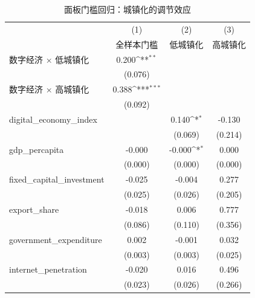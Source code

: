 \begin{table}[htbp]\centering
\def\sym#1{\ifmmode^{#1}\else\(^{#1}\)\fi}
\caption{面板门槛回归：城镇化的调节效应\label{tab:threshold}}
\begin{tabular}{l*{3}{c}}
\toprule
                    &\multicolumn{1}{c}{(1)}&\multicolumn{1}{c}{(2)}&\multicolumn{1}{c}{(3)}\\
                    &\multicolumn{1}{c}{全样本门槛}&\multicolumn{1}{c}{低城镇化}&\multicolumn{1}{c}{高城镇化}\\
\midrule
数字经济 × 低城镇化 &       0.200\sym{**} &                     &                     \\
                    &     (0.076)         &                     &                     \\
\addlinespace
数字经济 × 高城镇化 &       0.388\sym{***}&                     &                     \\
                    &     (0.092)         &                     &                     \\
\addlinespace
digital\_economy\_index&                     &       0.140\sym{*}  &      -0.130         \\
                    &                     &     (0.069)         &     (0.214)         \\
\addlinespace
gdp\_percapita       &      -0.000         &      -0.000\sym{*}  &       0.000         \\
                    &     (0.000)         &     (0.000)         &     (0.000)         \\
\addlinespace
fixed\_capital\_investment&      -0.025         &      -0.004         &       0.277         \\
                    &     (0.025)         &     (0.026)         &     (0.205)         \\
\addlinespace
export\_share        &      -0.018         &       0.006         &       0.777         \\
                    &     (0.086)         &     (0.110)         &     (0.356)         \\
\addlinespace
government\_expenditure&       0.002         &      -0.001         &       0.032         \\
                    &     (0.003)         &     (0.003)         &     (0.025)         \\
\addlinespace
internet\_penetration&      -0.020         &       0.016         &       0.496         \\
                    &     (0.023)         &     (0.026)         &     (0.266)         \\

\end{tabular}
\end{table}
